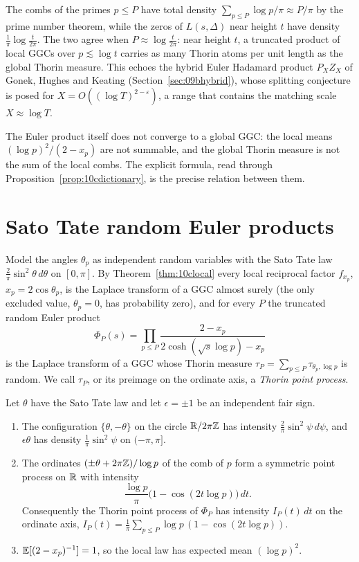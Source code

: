 \begin{remark}[Heuristic]
The combs of the primes $p\le P$ have total density $\sum_{p\le P}\log p/\pi\approx P/\pi$ by the prime number theorem, while the zeros of $L(s,\Delta)$ near height $t$ have density $\frac1\pi\log\frac{t}{2\pi}$. The two agree when $P\approx\log\frac{t}{2\pi}$: near height $t$, a truncated product of local GGCs over $p\lesssim\log t$ carries as many Thorin atoms per unit length as the global Thorin measure. This echoes the hybrid Euler Hadamard product $P_XZ_X$ of Gonek, Hughes and Keating \cite{ghk2007} (Section~\ref{sec:09bhybrid}), whose splitting conjecture is posed for $X=O((\log T)^{2-\varepsilon})$, a range that contains the matching scale $X\approx\log T$.
\end{remark}

The Euler product itself does not converge to a global GGC: the local means $(\log p)^2/(2-x_p)$ are not summable, and the global Thorin measure is not the sum of the local combs. The explicit formula, read through Proposition~\ref{prop:10cdictionary}, is the precise relation between them.

\section{Sato Tate random Euler products}

Model the angles $\theta_p$ as independent random variables with the Sato Tate law $\frac2\pi\sin^2\theta\,d\theta$ on $[0,\pi]$. By Theorem~\ref{thm:10clocal} every local reciprocal factor $f_{x_p}$, $x_p=2\cos\theta_p$, is the Laplace transform of a GGC almost surely (the only excluded value, $\theta_p=0$, has probability zero), and for every $P$ the truncated random Euler product
\[
\Phi_P(s)=\prod_{p\le P}\frac{2-x_p}{2\cosh(\sqrt s\log p)-x_p}
\]
is the Laplace transform of a GGC whose Thorin measure $\tau_P=\sum_{p\le P}\tau_{\theta_p,\log p}$ is random. We call $\tau_P$, or its preimage on the ordinate axis, a \emph{Thorin point process}.

\begin{proposition}\label{prop:10csatotate}
Let $\theta$ have the Sato Tate law and let $\epsilon=\pm1$ be an independent fair sign.
\begin{enumerate}
\item The configuration $\{\theta,-\theta\}$ on the circle $\mathbb{R}/2\pi\mathbb{Z}$ has intensity $\frac2\pi\sin^2\psi\,d\psi$, and $\epsilon\theta$ has density $\frac1\pi\sin^2\psi$ on $(-\pi,\pi]$.
\item The ordinates $(\pm\theta+2\pi\mathbb{Z})/\log p$ of the comb of $p$ form a symmetric point process on $\mathbb{R}$ with intensity
\[
\frac{\log p}{\pi}\bigl(1-\cos(2t\log p)\bigr)\,dt .
\]
Consequently the Thorin point process of $\Phi_P$ has intensity $I_P(t)\,dt$ on the ordinate axis, $I_P(t)=\frac1\pi\sum_{p\le P}\log p\,(1-\cos(2t\log p))$.
\item $\mathbb{E}[(2-x_p)^{-1}]=1$, so the local law has expected mean $(\log p)^2$.
\end{enumerate}
\end{proposition}

